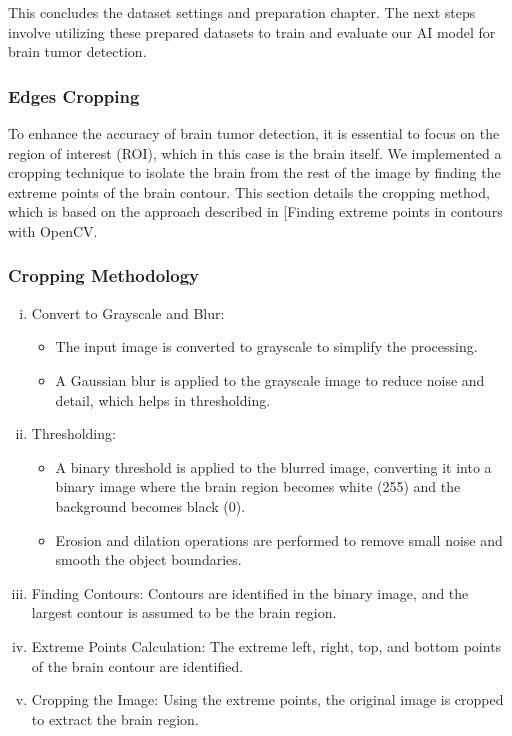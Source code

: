 This concludes the dataset settings and preparation chapter. The next steps involve utilizing these prepared datasets to train and evaluate our AI model for brain tumor detection. 

\subsubsection{Edges Cropping}

To enhance the accuracy of brain tumor detection, it is essential to focus on the region of interest (ROI), which in this case is the brain itself. We implemented a cropping technique to isolate the brain from the rest of the image by finding the extreme points of the brain contour. This section details the cropping method, which is based on the approach described in [Finding extreme points in contours with OpenCV.

\subsubsection{Cropping Methodology}

\begin{enumerate}[i)]
    \item Convert to Grayscale and Blur: 
        \begin{itemize}
            \item The input image is converted to grayscale to simplify the processing.
            \item A Gaussian blur is applied to the grayscale image to reduce noise and detail, which helps in thresholding.
        \end{itemize}
    \item Thresholding: 
        \begin{itemize}
            \item A binary threshold is applied to the blurred image, converting it into a binary image where the brain region becomes white (255) and the background becomes black (0). 
            \item Erosion and dilation operations are performed to remove small noise and smooth the object boundaries. 
        \end{itemize}
    \item Finding Contours: Contours are identified in the binary image, and the largest contour is assumed to be the brain region. 
    \item Extreme Points Calculation: The extreme left, right, top, and bottom points of the brain contour are identified.
    \item Cropping the Image: Using the extreme points, the original image is cropped to extract the brain region.
\end{enumerate}


